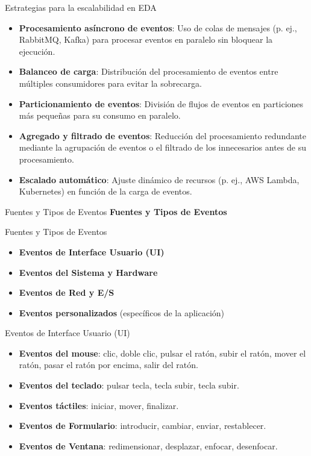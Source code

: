 \documentclass[11pt]{beamer}
\begin{document}
	\begin{frame}{Estrategias para la escalabilidad en EDA}
	
	\begin{itemize}
		\item \textbf{Procesamiento asíncrono de eventos}: Uso de colas de mensajes (p. ej., RabbitMQ, Kafka) para procesar eventos en paralelo sin bloquear la ejecución.
		\item \textbf{Balanceo de carga}: Distribución del procesamiento de eventos entre múltiples consumidores para evitar la sobrecarga.
		\item \textbf{Particionamiento de eventos}: División de flujos de eventos en particiones más pequeñas para su consumo en paralelo.
		\item \textbf{Agregado y filtrado de eventos}: Reducción del procesamiento redundante mediante la agrupación de eventos o el filtrado de los innecesarios antes de su procesamiento.
		\item \textbf{Escalado automático}: Ajuste dinámico de recursos (p. ej., AWS Lambda, Kubernetes) en función de la carga de eventos.
	\end{itemize}
	\end{frame}
	
	\begin{frame}{Fuentes y Tipos de Eventos}
		\huge \centering
		\textbf{Fuentes y Tipos de Eventos}
	\end{frame}
	
	\begin{frame}{Fuentes y Tipos de Eventos}
	\begin{itemize}
		\item \textbf{Eventos de Interface Usuario (UI)}
		\item \textbf{Eventos del Sistema y Hardware}
		\item \textbf{Eventos de Red y E/S}
		\item \textbf{Eventos personalizados} (específicos de la aplicación)
	\end{itemize}	
	\end{frame}
	
	\begin{frame}{Eventos de Interface Usuario (UI)}
		\begin{itemize}
			\item \textbf{Eventos del mouse}: clic, doble clic, pulsar el ratón, subir el ratón, mover el ratón, pasar el ratón por encima, salir del ratón.
			\item \textbf{Eventos del teclado}: pulsar tecla, tecla subir, tecla subir.
			\item \textbf{Eventos táctiles}: iniciar, mover, finalizar.
			\item \textbf{Eventos de Formulario}: introducir, cambiar, enviar, restablecer.
			\item \textbf{Eventos de Ventana}: redimensionar, desplazar, enfocar, desenfocar.
		\end{itemize}	
	\end{frame}
	
\end{document}
